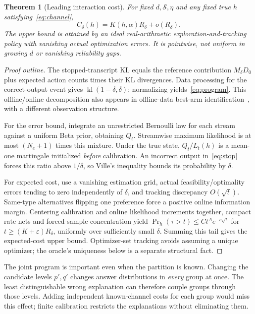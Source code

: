 \documentclass[sigconf,anonymous,review]{acmart}
\newtheorem{theorem}{Theorem}
\newcommand{\kl}{\operatorname{kl}}
\begin{document}
\begin{theorem}[Leading interaction cost]\label{thm:cost}
For fixed $d,\mathcal S,\eta$ and any fixed true $h$ satisfying~\eqref{eq:channel},
\[
 C_\delta(h)=K(h,\alpha)R_\delta+o(R_\delta).
\]
The upper bound is attained by an ideal real-arithmetic exploration-and-tracking policy with vanishing actual optimization errors. It is pointwise, not uniform in growing $d$ or vanishing reliability gaps.
\end{theorem}
\begin{proof}[Proof outline]
The stopped-transcript KL equals the reference contribution $M_\delta D_0$ plus expected action counts times their KL divergences. Data processing for the correct-output event gives $\kl(1-\delta,\delta)$; normalizing yields~\eqref{eq:program}. This offline/online decomposition also appears in offline-data best-arm identification~\cite{agrawal2023}, with a different observation structure.

For the error bound, integrate an unrestricted Bernoulli law for each stream against a uniform Beta prior, obtaining $Q_t$. Streamwise maximum likelihood is at most $(N_e+1)$ times this mixture. Under the true state, $Q_t/L_t(h)$ is a mean-one martingale initialized \emph{before} calibration. An incorrect output in~\eqref{eq:stop} forces this ratio above $1/\delta$, so Ville's inequality bounds its probability by $\delta$.

For expected cost, use a vanishing estimation grid, actual feasibility/optimality errors tending to zero independently of $\delta$, and tracking discrepancy $O(\sqrt t)$. Same-type alternatives flipping one preference force a positive online information margin. Centering calibration and online likelihood increments together, compact rate nets and forced-sample concentration yield
$\Pr_h(\tau>t)\le Ct^A e^{-c\sqrt t}$ for $t\ge(K+\varepsilon)R_\delta$, uniformly over sufficiently small $\delta$. Summing this tail gives the expected-cost upper bound. Optimizer-set tracking avoids assuming a unique optimizer; the oracle's uniqueness below is a separate structural fact.
\end{proof}

The joint program is important even when the partition is known. Changing the candidate levels $p',q'$ changes answer distributions in \emph{every} group at once. The least distinguishable wrong explanation can therefore couple groups through those levels. Adding independent known-channel costs for each group would miss this effect; finite calibration restricts the explanations without eliminating them.
\end{document}
